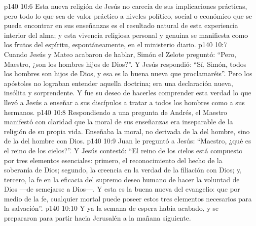 \vs p140 10:6 Esta nueva religión de Jesús no carecía de sus implicaciones prácticas, pero todo lo que sea de valor práctico a niveles político, social o económico que se pueda encontrar en sus enseñanzas es el resultado natural de esta experiencia interior del alma; y esta vivencia religiosa personal y genuina se manifiesta como los frutos del espíritu, espontáneamente, en el ministerio diario.
\vs p140 10:7 Cuando Jesús y Mateo acabaron de hablar, Simón el Zelote preguntó: “Pero, Maestro, ¿son  los hombres hijos de Dios?”. Y Jesús respondió: “Sí, Simón, todos los hombres son hijos de Dios, y esa es la buena nueva que proclamaréis”. Pero los apóstoles no lograban entender aquella doctrina; era una declaración nueva, insólita y sorprendente. Y fue su deseo de hacerles comprender esta verdad lo que llevó a Jesús a enseñar a sus discípulos a tratar a todos los hombres como a sus hermanos.
\vs p140 10:8 Respondiendo a una pregunta de Andrés, el Maestro manifestó con claridad que la moral de sus enseñanzas era inseparable de la religión de su propia vida. Enseñaba la moral, no derivada de la  del hombre, sino de la  del hombre con Dios.
\vs p140 10:9 \pc Juan le preguntó a Jesús: “Maestro, ¿qué es el reino de los cielos?”. Y Jesús contestó: “El reino de los cielos está compuesto por tres elementos esenciales: primero, el reconocimiento del hecho de la soberanía de Dios; segundo, la creencia en la verdad de la filiación con Dios; y, tercero, la fe en la eficacia del supremo deseo humano de hacer la voluntad de Dios ---de semejarse a Dios---. Y esta es la buena nueva del evangelio: que por medio de la fe, cualquier mortal puede poseer estos tres elementos necesarios para la salvación”.
\vs p140 10:10 \pc Y ya la semana de espera había acabado, y se prepararon para partir hacia Jerusalén a la mañana siguiente.
